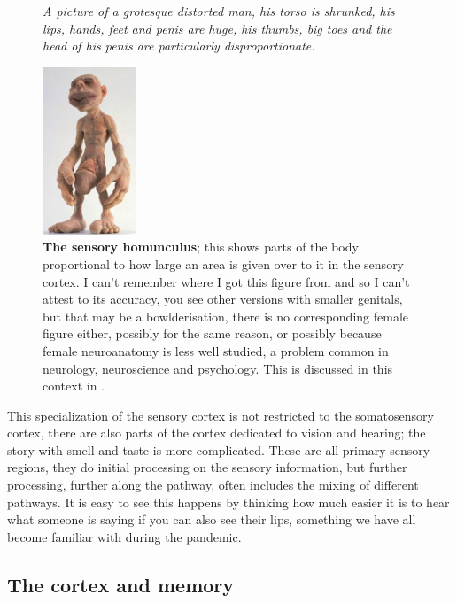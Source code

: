 \documentclass[12pt]{article}
\begin{document}
\begin{figure}[tbhp]
{\textsl{A picture of a grotesque distorted man, his torso is shrunked, his lips, hands, feet and penis are huge, his thumbs, big toes and the head of his penis are particularly disproportionate.}}
{
  \begin{center}
  \includegraphics[height=5cm]{sensory.jpg}
  \end{center}
  }
      \caption{\textbf{The sensory homunculus}; this shows parts of the
    body proportional to how large an area is given over to it in the
    sensory cortex. I can't remember where I got this figure from and
    so I can't attest to its accuracy, you see other versions with
    smaller genitals, but that may be a bowlderisation, there is no
    corresponding female figure either, possibly for the same reason,
    or possibly because female neuroanatomy is less well studied, a
    problem common in neurology, neuroscience and psychology. This is
    discussed in this context in
    \cite{WrightFoerder2020}.\label{fig_motor}}
\end{figure}

This specialization of the sensory cortex is not restricted to the
somatosensory cortex, there are also parts of the cortex dedicated to
vision and hearing; the story with smell and taste is more
complicated. These are all primary sensory regions, they do initial
processing on the sensory information, but further processing, further
along the pathway, often includes the mixing of different pathways. It
is easy to see this happens by thinking how much easier it is to hear
what someone is saying if you can also see their lips, something we
have all become familiar with during the pandemic.

\subsection*{The cortex and memory}
\end{document}
